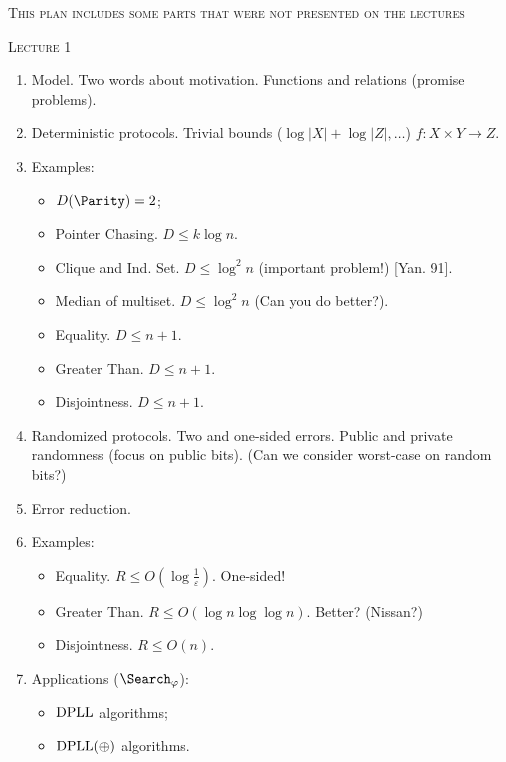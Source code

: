 \centerline{\textsc{This plan includes some parts that were not presented on the lectures}}

\centerline{\textsc{Lecture 1}}

\begin{enumerate}
    \item Model. Two words about motivation. Functions and relations (promise problems).
    \item Deterministic protocols. Trivial bounds ($\log |X| + \log |Z|, \dots$) $f: X \times Y \to Z$.
    \item Examples:
        \begin{itemize}
            \item $D(\Parity) = 2$;
            \item Pointer Chasing. $D \le k \log n$.
            \item Clique and Ind. Set. $D \le \log^2 n$ (important problem!) [Yan. 91].
            \item \skp Median of multiset. $D \le \log^2 n$ (Can you do better?).
            \item Equality. $D \le n + 1$.
            \item Greater Than. $D \le n + 1$.
            \item Disjointness. $D \le n + 1$.                
        \end{itemize}
    \item Randomized protocols. Two and one-sided errors. Public and private randomness (focus on public
        bits). (Can we consider worst-case on random bits?)
    \item Error reduction.
    \item Examples:
        \begin{itemize}
            \item Equality. $R \le O\left(\log \frac{1}{\varepsilon}\right)$. One-sided!
            \item Greater Than. $R \le O(\log n \log\log n)$. Better? (Nissan?)
            \item Disjointness. $R \le O(n)$.      
        \end{itemize}
    \item Applications ($\Search_{\varphi}$):
        \begin{itemize}
            \item $\mathrm{DPLL}$ algorithms;
            \item \skp $\mathrm{DPLL}(\oplus)$ algorithms.
        \end{itemize}
\end{enumerate}


